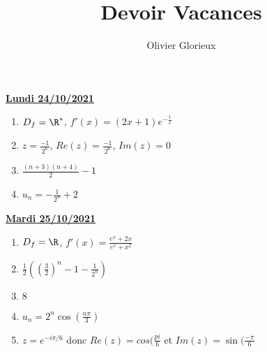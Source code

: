 \documentclass[a4paper, 11pt,reqno]{article}
\author{Olivier Glorieux}
\newcommand{\jour}[1]{
\begin{center}
\underline{\textbf{#1}}
\end{center}

 }
\begin{document}
\title{Devoir Vacances
}

\begin{center}
\underline{\textbf{Lundi 24/10/2021}}
\end{center}

\begin{correction}
\begin{enumerate}
\item $D_f= \R^*$, $f'(x) = (2x +1) e^{-\frac{1}{x}}$
\item $z=\frac{-1}{2^6}$, $Re(z) =\frac{-1}{2^6}$, $Im(z)=0$
\item $\frac{(n+3)(n+4)}{2} - 1$
\item $u_n= -\frac{1}{2^n} +2$
\end{enumerate}
\end{correction} 







\jour{Mardi 25/10/2021}
\begin{correction}
\begin{enumerate}
\item $D_f= \R$, $f'(x) =\frac{e^x+2x}{e^x+x^2}$
\item $\frac{1}{2} \left(  \left(\frac{3}{2}\right)^n -1- \frac{1}{2^n}\right)$
\item $8$
\item $u_n = 2^n\cos\left(\frac{n\pi}{3}\right)$
\item $z=e^{-i\pi/6} $ donc $Re(z) = cos(\frac{pi}{6}$ et $Im(z) =\sin(\frac{-\pi}{6}$
\end{enumerate}
\end{correction} 
\end{document}
